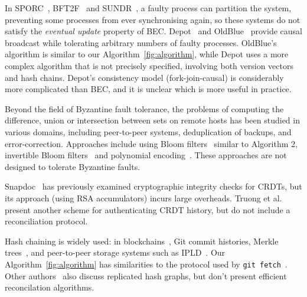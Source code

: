 \documentclass[a4paper,anonymous,USenglish]{lipics-v2019}
\begin{document}
In SPORC~\cite{Feldman:2010wl}, BFT2F~\cite{Li:2007} and SUNDR~\cite{Mazieres:2002}, a faulty process can partition the system, preventing some processes from ever synchronising again, so these systems do not satisfy the \emph{eventual update} property of BEC.
Depot~\cite{Mahajan:2011} and OldBlue~\cite{VanGundy:2012} provide causal broadcast while tolerating arbitrary numbers of faulty processes.
OldBlue's algorithm is similar to our Algorithm~\ref{fig:algorithm}, while Depot uses a more complex algorithm that is not precisely specified, involving both version vectors and hash chains.
Depot's consistency model (fork-join-causal) is considerably more complicated than BEC, and it is unclear which is more useful in practice.

Beyond the field of Byzantine fault tolerance, the problems of computing the difference, union or intersection between sets on remote hosts has been studied in various domains, including peer-to-peer systems, deduplication of backups, and error-correction.
Approaches include using Bloom filters~\cite{Skjegstad:2011} similar to Algorithm 2, invertible Bloom filters~\cite{Goodrich:2011,Eppstein:2011} and polynomial encoding~\cite{Minsky:2006}.
These approaches are not designed to tolerate Byzantine faults.

Snapdoc~\cite{Kollmann:2019hf} has previously examined cryptographic integrity checks for CRDTs, but its approach (using RSA accumulators) incurs large overheads.
Truong et al.~\cite{Truong:2012et} present another scheme for authenticating CRDT history, but do not include a reconciliation protocol.

Hash chaining is widely used: in blockchains~\cite{Bano:2019}, Git commit histories, Merkle trees~\cite{Merkle:1987}, and peer-to-peer storage systems such as IPLD~\cite{IPLD}.
Our Algorithm~\ref{fig:algorithm} has similarities to the protocol used by \texttt{git fetch}~\cite{GitHTTP}.
Other authors~\cite{Baird:2016tq,Kang:2003} also discuss replicated hash graphs, but don't present efficient reconcilation algorithms.




\end{document}
